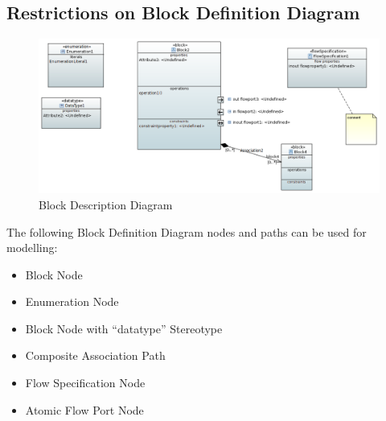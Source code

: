 \subsection{Restrictions on Block Definition Diagram}



\begin{figure}[ht]
  \centering
  \includegraphics[width=\textwidth]{images/BDDDiagram.PNG}
  \caption{Block Description Diagram}
  \label{fig:Bdd}
\end{figure}



The following Block Definition Diagram nodes and paths can be used for
modelling:
\begin{itemize}
\item Block Node 
\item Enumeration Node 
\item Block Node with ``datatype'' Stereotype 
\item Composite Association Path 
\item Flow Specification Node 
\item Atomic Flow Port Node     
\end{itemize}

